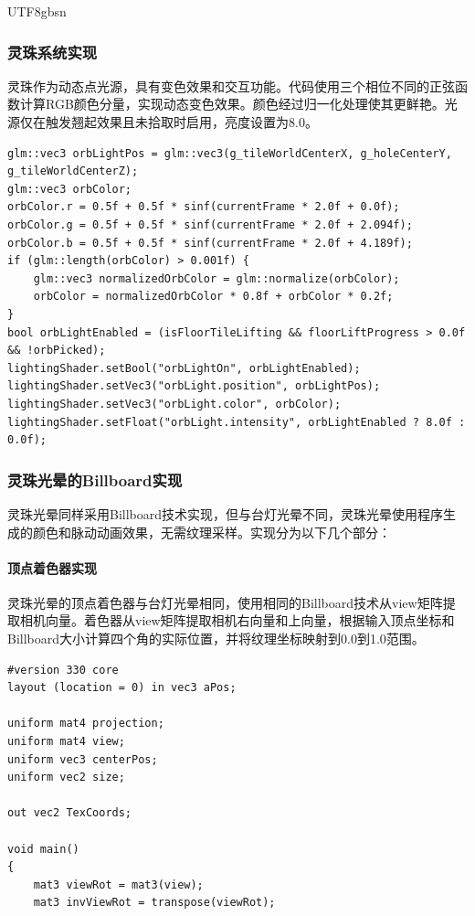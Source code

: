 \documentclass{article}
\begin{document}
\begin{CJK}{UTF8}{gbsn}
\subsubsection{灵珠系统实现}
灵珠作为动态点光源，具有变色效果和交互功能。代码使用三个相位不同的正弦函数计算RGB颜色分量，实现动态变色效果。颜色经过归一化处理使其更鲜艳。光源仅在触发翘起效果且未拾取时启用，亮度设置为8.0。

\begin{lstlisting}[caption=灵珠渲染与光照]
glm::vec3 orbLightPos = glm::vec3(g_tileWorldCenterX, g_holeCenterY, g_tileWorldCenterZ);
glm::vec3 orbColor;
orbColor.r = 0.5f + 0.5f * sinf(currentFrame * 2.0f + 0.0f);
orbColor.g = 0.5f + 0.5f * sinf(currentFrame * 2.0f + 2.094f);
orbColor.b = 0.5f + 0.5f * sinf(currentFrame * 2.0f + 4.189f);
if (glm::length(orbColor) > 0.001f) {
    glm::vec3 normalizedOrbColor = glm::normalize(orbColor);
    orbColor = normalizedOrbColor * 0.8f + orbColor * 0.2f;
}
bool orbLightEnabled = (isFloorTileLifting && floorLiftProgress > 0.0f && !orbPicked);
lightingShader.setBool("orbLightOn", orbLightEnabled);
lightingShader.setVec3("orbLight.position", orbLightPos);
lightingShader.setVec3("orbLight.color", orbColor);
lightingShader.setFloat("orbLight.intensity", orbLightEnabled ? 8.0f : 0.0f);
\end{lstlisting}

\subsubsection{灵珠光晕的Billboard实现}
灵珠光晕同样采用Billboard技术实现，但与台灯光晕不同，灵珠光晕使用程序生成的颜色和脉动动画效果，无需纹理采样。实现分为以下几个部分：

\paragraph{顶点着色器实现}
灵珠光晕的顶点着色器与台灯光晕相同，使用相同的Billboard技术从view矩阵提取相机向量。着色器从view矩阵提取相机右向量和上向量，根据输入顶点坐标和Billboard大小计算四个角的实际位置，并将纹理坐标映射到0.0到1.0范围。

\begin{lstlisting}[caption=灵珠光晕顶点着色器]
#version 330 core
layout (location = 0) in vec3 aPos;

uniform mat4 projection;
uniform mat4 view;
uniform vec3 centerPos;
uniform vec2 size;

out vec2 TexCoords;

void main()
{
    mat3 viewRot = mat3(view);
    mat3 invViewRot = transpose(viewRot);
    

\end{lstlisting}
\end{CJK}
\end{document}
